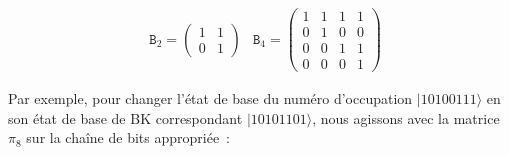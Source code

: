\documentclass[12pt,a4paper]{article} %
\numberwithin{equation}{section} %
\numberwithin{figure}{section} %
\numberwithin{table}{section} %
\begin{document}
\begin{align*}
    &\mathtt{B}_2 = \begin{pmatrix}1 & 1\\0 & 1 \end{pmatrix}
    &\mathtt{B}_4 = \left(\begin{array}{cc|cc}
    1 & 1 & 1 & 1 \\
    0 & 1 & 0 & 0 \\\hline
    0 & 0 & 1 & 1 \\
    0 & 0 & 0 & 1 
 \end{array}\right)
\end{align*}

Par exemple, pour changer l'état de base du numéro d'occupation $|1 0 1 0 0 1 1 1\rangle$ en son état de base de BK correspondant $|1 0 1 0 1 1 0 1\rangle$, nous agissons avec la matrice $\pi_8$ sur la chaîne de bits appropriée :
\end{document}
